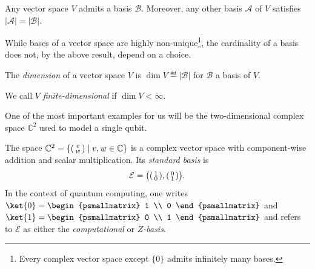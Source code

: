 \documentclass[a4paper,oneside, 12pt]{amsart}
\begin{document}
\begin{theorem}\label{thm:existence-of-bases-and-well-defd-dimension}
  Any vector space \(V\) admits a basis \(\mathcal{B}\).
  Moreover, any other basis \(\mathcal{A}\) of \(V\) satisfies \(|\mathcal{A}| = |\mathcal{B}|\).
\end{theorem}

While bases of a vector space are highly non-unique\footnote{Every complex vector space except \(\{0\}\) admits infinitely many bases.}, the cardinality of a basis does not, by the above result, depend on a choice.

\begin{definition}\label{def:finite-dimensional-vs}
  The \emph{dimension} of a vector space \(V\) is \(\dim V \eqdef | \mathcal{B}| \) for \(\mathcal{B}\) a basis of \(V\).

  We call \(V\) \emph{finite-dimensional} if \(\dim V < \infty\).
\end{definition}

One of the most important examples for us will be the two-dimensional complex space \( \mathbb{C}^{2}\) used to model a single qubit.

\begin{example}\label{ex:c2}
  The space \( \mathbb{C}^2=\{\begin{psmallmatrix} v \\ w \end{psmallmatrix} \mid v,w \in \mathbb{C}
  \}\) is a complex vector space with component-wise addition and scalar multiplication.
  Its \emph{standard basis} is
  \begin{equation*}
    \mathcal{E}= \big(\begin{psmallmatrix} 1 \\ 0 \end{psmallmatrix},
    \begin{psmallmatrix} 0 \\ 1 \end{psmallmatrix} \big).
  \end{equation*}
  In the context of quantum computing, one writes \(\ket{0} = \begin{psmallmatrix} 1 \\ 0 \end{psmallmatrix}\) and \(\ket{1} = \begin{psmallmatrix} 0 \\ 1 \end{psmallmatrix}\) and refers to \(\mathcal{E}\) as either the \emph{computational} or \emph{\(Z\)-basis}.
\end{example}
\end{document}
